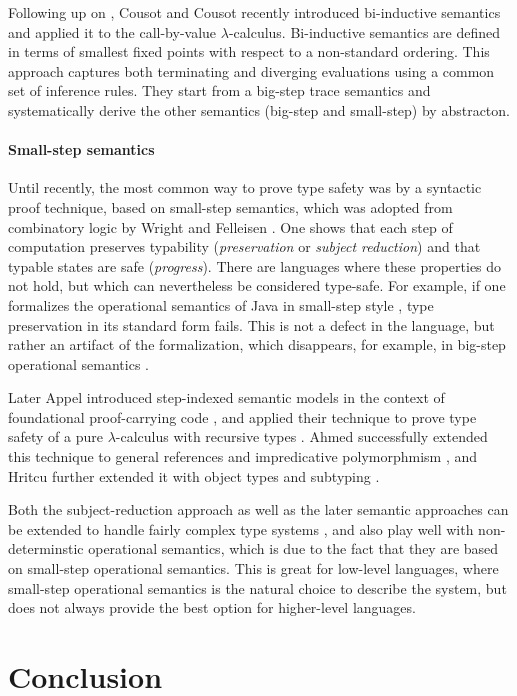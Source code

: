 \documentclass[a4paper,final,preprint,sort&compress]{elsarticle}
\begin{document}
Following up on \cite{CousotCousot92}, Cousot and Cousot recently introduced bi-inductive
semantics \cite{CousotCousot07} and applied it to the call-by-value $\lambda$-calculus.
Bi-inductive semantics are defined in terms of smallest fixed points with respect to a
non-standard ordering. This approach captures both terminating and diverging evaluations
using a common set of inference rules. They start from a big-step trace semantics and
systematically derive the other semantics (big-step and small-step) by abstracton.


\paragraph{Small-step semantics}

Until recently, the most common way to prove type safety was by a syntactic proof
technique, based on small-step semantics, which was adopted from combinatory
logic by Wright and Felleisen \cite{WrightFelleisen94}. One shows that each step of
computation preserves typability (\emph{preservation} or \emph{subject reduction})
and that typable states are safe (\emph{progress}). There are
languages where these properties do not hold, but which can nevertheless be
considered type-safe. For example, if one formalizes the operational semantics
of Java in small-step style \cite{FlattKrishnamurthiFelleisen98,IgarashiPierceWadler01},
type preservation in its standard form fails. This is
not a defect in the language, but rather an artifact of the formalization, which
disappears, for example, in big-step operational semantics \cite{Pierce02}.

Later Appel \ETAL introduced step-indexed semantic models in the context of
foundational proof-carrying code \cite{AppelFelty00}, and applied their technique
to prove type safety of a pure $\lambda$-calculus with recursive types
\cite{AppelMcAllester01}. Ahmed \ETAL successfully extended this technique to
general references and impredicative polymorphmism \cite{AhmedAppelVirga02,Ahmed04},
and Hritcu \ETAL further extended it with object types and subtyping
\cite{Hritcu07,HritcuSchwinghammer09}.

Both the subject-reduction approach as well as the later semantic approaches
can be extended to handle fairly complex type systems \cite{Pierce02}, and also play well with
non-determinstic operational semantics, which is due to the fact that they are
based on small-step operational semantics. This is great for low-level languages,
where small-step operational semantics is the natural choice to describe the
system, but does not always provide the best option for higher-level languages.



\section{Conclusion}
\label{sec:Conclusion}






\end{document}
